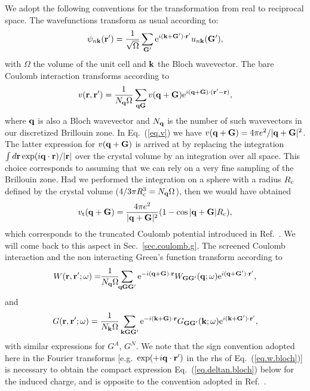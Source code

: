 \documentclass[twocolumn,prb,showpacs,superscriptaddress]{revtex4}
\def\w{\omega}
\def\q{{\bf q}}
\def\k{{\bf k}}
\def\G{{\bf G}}
\def\Gp{{\bf G^\prime}}
\def\r{{\bf r}}
\def\rp{{\bf r^\prime}}
\begin{document}
We adopt the following conventions for the transformation from real to reciprocal space.
The wavefunctions transform as usual according to:
  \begin{equation}
  \psi_{n\k}(\rp)=\frac{1}{\sqrt{\Omega}}\sum_\Gp
  {\rm e}^{i(\k+\Gp)\cdot\rp} u_{n\k}(\Gp),
  \end{equation}
with $\Omega$ the volume of the unit cell and $\k$ the Bloch wavevector.
The bare Coulomb interaction transforms according to
  \begin{equation}\label{eq.v}
  v(\r,\rp) = \frac{1}{N_\q\Omega}  \sum_{\q\G} v(\q+\G)
  {\rm e}^{i(\q+\G)\cdot(\rp-\r)},
  \end{equation}
where $\q$ is also a Bloch wavevector and $N_\q$ is the number of such wavevectors
in our discretized Brillouin zone. In Eq.\ (\ref{eq.v}) we have 
$v(\q+\G) = 4\pi e^2/|\q+\G|^2$.
The latter expression for $v(\q+\G)$ is arrived at by replacing
the integration $\int d\r \exp(i\q\cdot\r)/|\r|$ over the crystal volume by 
an integration over all space. This choice corresponds to assuming that 
we can rely on a very fine sampling of the Brillouin zone.
Had we performed the integration on a sphere
with a radius $R_{\rm c}$ defined by the crystal volume 
($4/3\pi R_{\rm c}^3 = N_\q \Omega$), then we would have obtained
  \begin{equation}
  v_{\rm t} (\q+\G) = \frac{4\pi e^2}{|\q+\G|^2} (1-\cos |\q+\G| R_{\rm c}),
  \end{equation}
which corresponds to the truncated Coulomb potential introduced in Ref.\ .
We will come back to this aspect in Sec.\ \ref{sec.coulomb.g}.
The screened Coulomb interaction and the non interacting Green's function
transform according to
  \begin{equation}\label{eq.w.bloch}
  W(\r,\rp;\w) = \!\!\frac{1}{N_\q\Omega} \!\! \sum_{\q\G\Gp} 
  {\rm e}^{-i(\q+\G)\cdot\r}
  W_{\G\Gp}(\q;\w)
  {\rm e}^{i(\q+\Gp)\cdot\rp},
  \end{equation}
and
  \begin{equation}
  G (\r,\rp;\w) = \frac{1}{N_\k\Omega}  \sum_{\k\G\Gp} 
   {\rm e}^{-i(\k+\G)\cdot\r} 
   G_{\G\Gp}(\k;\w)
   {\rm e}^{i(\k+\Gp)\cdot\rp},
  \end{equation}
with similar expressions for $G^A$, $G^N$.
We note that the sign convention adopted here in the Fourier transforms
[e.g.\ ${\rm exp}(+i\q\cdot\rp)$ in the rhs of Eq.\ (\ref{eq.w.bloch})]
is necessary to obtain the compact expression Eq.\ (\ref{eq.deltan.bloch}) below
for the induced charge, and is opposite to the convention adopted in Ref.~.
\end{document}
